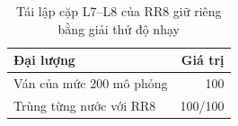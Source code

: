 \begin{table}[H]
  \centering
  \small
  \caption{Tái lập cặp L7--L8 của RR8 giữ riêng bằng giải thử độ nhạy}
  \label{tab:cs-dn-tailap}
  \begin{tabular}{lr}
    \toprule
    Đại lượng & Giá trị \\
    \midrule
    Ván của mức 200 mô phỏng & 100 \\
    Trùng từng nước với RR8 & 100/100 \\
    \bottomrule
  \end{tabular}
\end{table}
